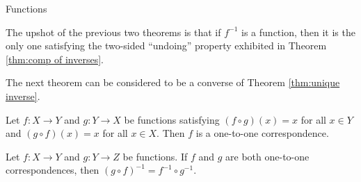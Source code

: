 \begin{section}{Functions}
\begin{remark}
The upshot of the previous two theorems is that if \(f^{-1}\) is a function, then it is the only one satisfying the two-sided ``undoing'' property exhibited in Theorem \ref{thm:comp of inverses}.
\end{remark}

The next theorem can be considered to be a converse of Theorem \ref{thm:unique inverse}.

\begin{theorem}
Let \(f:X\to Y\) and \(g:Y\to X\) be functions satisfying \((f\circ g)(x)=x\) for all \(x\in Y\) and \((g\circ f)(x)=x\) for all \(x\in X\).  Then \(f\) is a one-to-one correspondence.
\end{theorem}

\begin{theorem}
Let \(f:X\to Y\) and \(g:Y\to Z\) be functions.  If \(f\) and \(g\) are both one-to-one correspondences, then \((g\circ f)^{-1}=f^{-1}\circ g^{-1}\).
\end{theorem}

\end{section}

